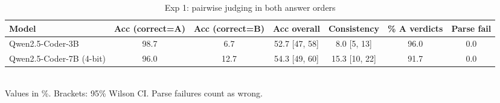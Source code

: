 \begin{table}[t]
\centering
\caption{Exp 1: pairwise judging in both answer orders}
\label{tab:t1_pairwise}
\footnotesize
\setlength{\tabcolsep}{3pt}
\begin{tabular}{lcccccc}
\hline
Model & Acc (correct=A) & Acc (correct=B) & Acc overall & Consistency & \% A verdicts & Parse fail \\
\hline
Qwen2.5-Coder-3B & 98.7 & 6.7 & 52.7 [47, 58] & 8.0 [5, 13] & 96.0 & 0.0 \\
Qwen2.5-Coder-7B (4-bit) & 96.0 & 12.7 & 54.3 [49, 60] & 15.3 [10, 22] & 91.7 & 0.0 \\
\hline
\end{tabular}
\\[2pt]
{\scriptsize Values in \%. Brackets: 95\% Wilson CI. Parse failures count as wrong.}
\end{table}
